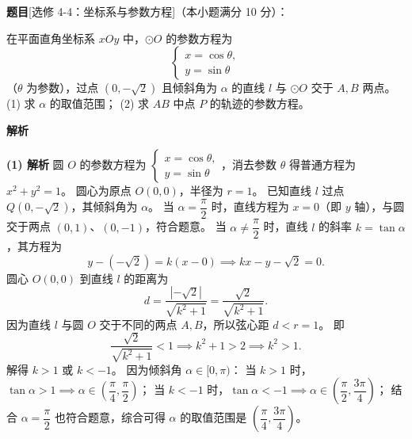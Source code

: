 \begin{answer}

\textbf{题目}[选修 4-4：坐标系与参数方程]（本小题满分 10 分）：

在平面直角坐标系 $xOy$ 中，$\odot O$ 的参数方程为
\nopagebreak[4]
\[
\begin{cases}
x = \cos\theta, \\
y = \sin\theta
\end{cases}
\]
（$\theta$ 为参数），过点 $(0, -\sqrt2)$ 且倾斜角为 $\alpha$ 的直线 $l$ 与 $\odot O$ 交于 $A, B$ 两点。
(1) 求 $\alpha$ 的取值范围；
(2) 求 $AB$ 中点 $P$ 的轨迹的参数方程。

\textbf{解析}

\textbf{(1) 解析} 圆 $O$ 的参数方程为 $\begin{cases} x = \cos\theta, \\ y = \sin\theta \end{cases}$，消去参数 $\theta$ 得普通方程为 $x^2 + y^2 = 1$。
圆心为原点 $O(0, 0)$，半径为 $r = 1$。
已知直线 $l$ 过点 $Q(0, -\sqrt2)$，其倾斜角为 $\alpha$。
当 $\alpha = \dfrac\pi2$ 时，直线方程为 $x = 0$（即 $y$ 轴），与圆交于两点 $(0, 1)$、$(0, -1)$，符合题意。
当 $\alpha \neq \dfrac\pi2$ 时，直线 $l$ 的斜率 $k = \tan\alpha$，其方程为
\nopagebreak[4]
\[y - (-\sqrt2) = k(x - 0) \implies kx - y - \sqrt2 = 0.\]
圆心 $O(0, 0)$ 到直线 $l$ 的距离为
\nopagebreak[4]
\[d = \dfrac{|-\sqrt2|}{\sqrt{k^2 + 1}} = \dfrac{\sqrt2}{\sqrt{k^2 + 1}}.\]
因为直线 $l$ 与圆 $O$ 交于不同的两点 $A, B$，所以弦心距 $d < r = 1$。
即
\nopagebreak[4]
\[\dfrac{\sqrt2}{\sqrt{k^2 + 1}} < 1 \implies k^2 + 1 > 2 \implies k^2 > 1.\]
解得 $k > 1$ 或 $k < -1$。
因为倾斜角 $\alpha \in [0, \pi)$：
当 $k > 1$ 时，$\tan\alpha > 1 \implies \alpha \in \left(\dfrac\pi4, \dfrac\pi2\right)$；
当 $k < -1$ 时，$\tan\alpha < -1 \implies \alpha \in \left(\dfrac\pi2, \dfrac{3\pi}{4}\right)$；
结合 $\alpha = \dfrac\pi2$ 也符合题意，综合可得 $\alpha$ 的取值范围是 $\left(\dfrac\pi4, \dfrac{3\pi}{4}\right)$。


\end{answer}
